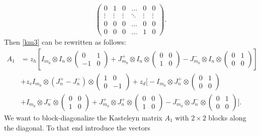 \documentclass[12pt,reqno]{amsart}
\numberwithin{equation}{section}
\begin{document}
\begin{appendix}
\begin{equation}
\begin{aligned}
\begin{pmatrix}
0 & 1 & 0 & \ldots & 0 & 0\\
\vdots & \vdots & \vdots & \ddots & \vdots  & \vdots \\
0 & 0 & 0 & \ldots & 0 & 0 \\
0 & 0 & 0 & \ldots & 1 & 0
\end{pmatrix}.
\end{aligned}
\end{equation}
Then \eqref{km3} can be rewritten as follows:
\begin{equation}\label{km5}
\begin{aligned}
A_1&=z_h\left[I_{m_0}\otimes I_n\otimes
\begin{pmatrix}
0 & 1 \\
-1 & 0
\end{pmatrix}
+J_{m_0}^+\otimes I_n \otimes 
\begin{pmatrix}
0 & 0 \\
1 & 0
\end{pmatrix}
-J_{m_0}^-\otimes I_n \otimes 
\begin{pmatrix}
0 & 1 \\
0 & 0
\end{pmatrix}
\right]\\
&+z_v I_{m_0}\otimes (J_n^+-J_n^-)\otimes \begin{pmatrix}
1 & 0 \\
0 & -1
\end{pmatrix}
+z_d\bigg[-I_{m_0}\otimes J_n^+\otimes \begin{pmatrix}
0 & 1 \\
0 & 0
\end{pmatrix}\\
&+I_{m_0}\otimes J_n^-\otimes \begin{pmatrix}
0 & 0 \\
1 & 0
\end{pmatrix}
+J_{m_0}^+\otimes J_n^+\otimes \begin{pmatrix}
0 & 0 \\
1 & 0
\end{pmatrix}
-J_{m_0}^-\otimes J_n^-\otimes \begin{pmatrix}
0 & 1 \\
0 & 0
\end{pmatrix}
\bigg].
\end{aligned}
\end{equation}
We want to block-diagonalize the Kasteleyn matrix $A_1$ with $2\times 2$ blocks
along the diagonal. To that end introduce the vectors
\begin{equation}\label{km6}

\end{equation}
\end{appendix}
\end{document}
